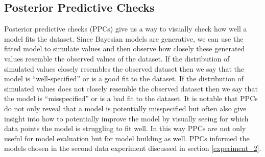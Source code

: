 \subsection*{Posterior Predictive Checks} \label{ppc}

Posterior predictive checks (PPCs) give us a way to visually check how well a model fits the dataset. Since Bayesian models are generative, we can use the fitted model to simulate values and then observe how closely these generated values resemble the observed values of the dataset. If the distribution of simulated values closely resembles the observed dataset then we say that the model is ``well-specified'' or is a good fit to the dataset. If the distribution of simulated values does not closely resemble the observed dataset then we say that the model is ``misspecified'' or is a bad fit to the dataset. It is notable that PPCs do not only reveal that a model is potentially misspecified but often also give insight into how to potentially improve the model by visually seeing for which data points the model is struggling to fit well. In this way PPCs are not only useful for model evaluation but for model building as well. PPCs informed the models chosen in the second data experiment discussed in section \ref{experiment_2}.
